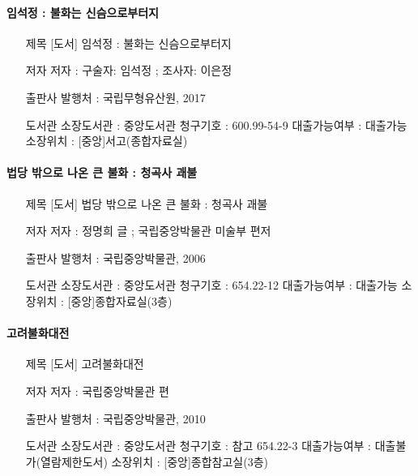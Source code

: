\documentclass[12pt, a4paper, oneside]{book}
\begin{document}
\paragraph{ 임석정 : 불화는 신슴으로부터지 }

\begin{itemize}[					
		topsep=0.0em,			
		parsep=0.0em,			
		itemsep=0em,			
		leftmargin=	5	em,
		labelwidth=	1	em,			
		labelsep=		1	 em			
]					
	\item	[제목]	[도서] 임석정 : 불화는 신슴으로부터지	\item	[저자]	저자 : 구술자: 임석정 ; 조사자: 이은정	\item	[출판사]	발행처 : 국립무형유산원, 2017	\item	[도서관]	소장도서관 : 중앙도서관	청구기호 : 600.99-54-9	대출가능여부 : 대출가능	소장위치 : [중앙]서고(종합자료실)

\end{itemize}					


\paragraph{ 법당 밖으로 나온 큰 불화 : 청곡사 괘불 }

\begin{itemize}[					
		topsep=0.0em,			
		parsep=0.0em,			
		itemsep=0em,			
		leftmargin=	5	em,
		labelwidth=	1	em,			
		labelsep=		1	 em			
]					
	\item	[제목]	[도서] 법당 밖으로 나온 큰 불화 : 청곡사 괘불	\item	[저자]	저자 : 정명희 글 ; 국립중앙박물관 미술부 편저	\item	[출판사]	발행처 : 국립중앙박물관, 2006	\item	[도서관]	소장도서관 : 중앙도서관	청구기호 : 654.22-12	대출가능여부 : 대출가능	소장위치 : [중앙]종합자료실(3층)
\end{itemize}					


\paragraph{ 고려불화대전 }

\begin{itemize}[					
		topsep=0.0em,			
		parsep=0.0em,			
		itemsep=0em,			
		leftmargin=	5	em,
		labelwidth=	1	em,			
		labelsep=		1	 em			
]					

	\item	[제목]	[도서] 고려불화대전	\item	[저자]	저자 : 국립중앙박물관 편	\item	[출판사]	발행처 : 국립중앙박물관, 2010	\item	[도서관]	소장도서관 : 중앙도서관	청구기호 : 참고 654.22-3	대출가능여부 : 대출불가(열람제한도서)	소장위치 : [중앙]종합참고실(3층)
\end{itemize}					
\end{document}
